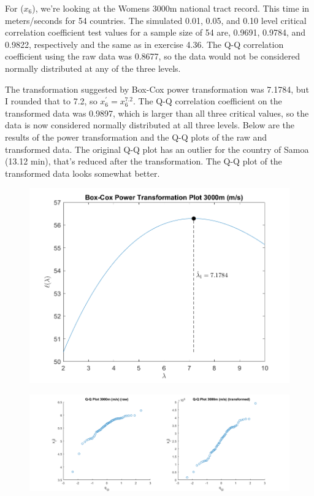 For ($x_{6}$), we're looking at the Womens 3000m national tract record. This time in meters/seconds for 54 countries. The simulated 0.01, 0.05, and 0.10 level critical correlation coefficient test values for a sample size of 54 are, 0.9691, 0.9784, and 0.9822, respectively and the same as in exercise 4.36. The Q-Q correlation coefficient using the raw data was 0.8677, so the data would not be considered normally distributed at any of the three levels.

The transformation suggested by Box-Cox power transformation was 7.1784, but I rounded that to 7.2, so $x_{6}^{\prime} = x_{6}^{7.2}$.
The Q-Q correlation coefficient on the transformed data was 0.9897, which is larger than all three critical values, so the data is now considered normally distributed at all three levels.
Below are the results of the power transformation and the Q-Q plots of the raw and transformed data.
The original Q-Q plot has an outlier for the country of Samoa (13.12 min), that's reduced after the transformation. The Q-Q plot of the transformed data looks somewhat better.

\begin{center}
    \begin{figure}[H]
        \centering
        \includegraphics[scale=0.6]{./matlab/chapter-4/sol4.37.power.6.png}
    \end{figure}
\end{center}

\begin{center}
    \begin{figure}[H]
        \centering
        \includegraphics[scale=0.4]{./matlab/chapter-4/sol4.37.qq.6.png}
    \end{figure}
\end{center}

